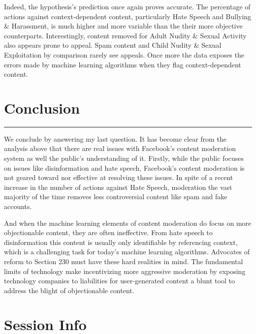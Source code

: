 \documentclass[
]{article}
\begin{document}
Indeed, the hypothesis's prediction once again proves accurate. The
percentage of actions against context-dependent content, particularly
Hate Speech and Bullying \& Harassment, is much higher and more variable
than the their more objective counterparts. Interestingly, content
removed for Adult Nudity \& Sexual Activity also appears prone to
appeal. Spam content and Child Nudity \& Sexual Exploitation by
comparison rarely see appeals. Once more the data exposes the errors
made by machine learning algorithms when they flag context-dependent
content.

\hypertarget{conclusion}{%
\section{Conclusion}\label{conclusion}}

\begin{center}\rule{0.5\linewidth}{0.5pt}\end{center}

We conclude by answering my last question. It has become clear from the
analysis above that there are real issues with Facebook's content
moderation system as well the public's understanding of it. Firstly,
while the public focuses on issues like disinformation and hate speech,
Facebook's content moderation is not geared toward nor effective at
resolving these issues. In spite of a recent increase in the number of
actions against Hate Speech, moderation the vast majority of the time
removes less controversial content like spam and fake accounts.

And when the machine learning elements of content moderation do focus on
more objectionable content, they are often ineffective. From hate speech
to disinformation this content is usually only identifiable by
referencing context, which is a challenging task for today's machine
learning algorithms. Advocates of reform to Section 230 must have these
hard realities in mind. The fundamental limits of technology make
incentivizing more aggressive moderation by exposing technology
companies to liabilities for user-generated content a blunt tool to
address the blight of objectionable content.

\hypertarget{session-info}{%
\section{Session Info}\label{session-info}}
\end{document}
